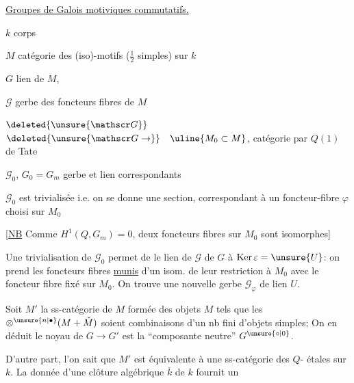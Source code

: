 \uline{Groupes de Galois motiviques commutatifs.}

$k$ corps

$M$ catégorie des (iso)-motifs ($\frac12$ simples) sur $k$

$G$ lien de $M$, 

$\mathscr G$ gerbe des  foncteurs fibres de $M$

$\deleted{\unsure{\mathscr G}}$
$\deleted{\unsure{\mathscr G\to}}\quad\uline{M_0\subset M}$, catégorie   par $Q(1)$ de Tate

$\mathscr G_0$, $G_0=G_m$ gerbe et lien correspondants

$\mathscr G_0$ est trivialisée i.e. on se donne une section, correspondant à un foncteur-fibre $\varphi$  choisi sur $M_0$

[\uline{NB} Comme $H^1(Q,G_m)=0$, deux foncteurs fibres sur $M_0$ sont  isomorphes]

Une trivialisation de $\mathscr G_0$ permet de \uline{} le lien de $\mathscr G$ de $G$ à $\operatorname{Ker}\varepsilon=\unsure{U}$: on prend les foncteurs fibres \uline{munis} d'un isom. de leur restriction à $M_0$ avec le foncteur fibre fixé sur $M_0$. On trouve une nouvelle gerbe $\mathscr G_\varphi$ de lien $U$.

Soit $M'$ la ss-catégorie de $M$ formée des objets $M$ tels que les $\otimes^{\unsure{n|\bullet}}(M+\check M)$ soient combinaisons d'un nb fini d'objets simples;  On en déduit
le noyau de $G\to G'$ est la ``composante neutre'' $G^{\unsure{\circ|0}}$.

D'autre part, l'on sait que $M'$ est équivalente à une ss-catégorie  des $Q$- étales sur $k$. La donnée d'une clôture algébrique $\overline k$ de $k$ fournit un
